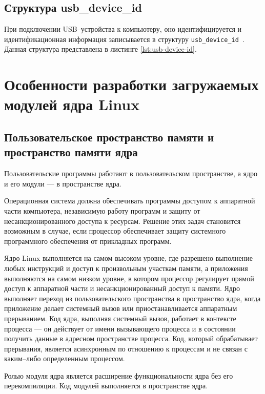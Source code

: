 \subsection{Структура usb\_device\_id}

При подключении USB--устройства к компьютеру, оно идентифицируется и идентификационная информация записывается в структуру \texttt{usb\_device\_id}~\cite{usb_device_id}. Данная структура представлена в листинге \ref{lst:usb-device-id}.


\section{Особенности разработки загружаемых модулей ядра Linux}

\subsection{Пользовательское пространство памяти и пространство памяти ядра}

Пользовательские программы работают в пользовательском пространстве, а ядро и его модули --- в пространстве ядра.

Операционная система должна обеспечивать программы доступом к аппаратной части компьютера, независимую работу программ и защиту от несанкционированного доступа к ресурсам. Решение этих задач становится возможным в случае, если процессор обеспечивает защиту системного программного обеспечения от прикладных программ.

Ядро Linux выполняется на самом высоком уровне, где разрешено выполнение любых инструкций и доступ к произвольным участкам памяти, а приложения выполняются на самом низком уровне, в котором процессор регулирует прямой доступ к аппаратной части и несанкционированный доступ к памяти. Ядро выполняет переход из пользовательского пространства в пространство ядра, когда приложение делает системный вызов или приостанавливается аппаратным прерыванием. Код ядра, выполняя системный вызов, работает в контексте процесса --- он действует от имени вызывающего процесса и в состоянии получить данные в адресном пространстве процесса. Код, который обрабатывает прерывания, является асинхронным по отношению к процессам и не связан с каким--либо определенным процессом.

Ролью модуля ядра является расширение функциональности ядра без его перекомпиляции. Код модулей выполняется в пространстве ядра.

